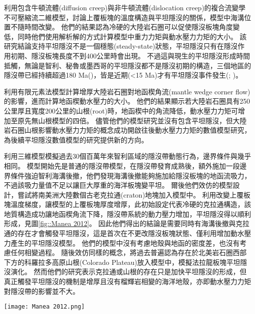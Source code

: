 \citealp{Thermal2012}利用包含牛頓流體(diffusion creep)與非牛頓流體(dislocation creep)的複合流變學不可壓縮流二維模型，討論上覆板塊的溫度構造與平坦隱沒的關係，模型中海溝位置不隨時間改變。
他們的結果認為冷硬的大陸岩石圈可以促使隱沒板塊角度變低，同時他們使用解析解的方式計算模型中重力力矩與動水壓力力矩的大小。
該研究結論支持平坦隱沒不是一個穩態(steady-state)狀態，平坦隱沒只有在隱沒作用初期、隱沒板塊長度不到400公里時會出現。
不過這與現生的平坦隱沒形成時間抵觸，無論是智利、秘魯或墨西哥的平坦隱沒都不是隱沒初期的構造，三個地區的隱沒帶已經持續超過180 Ma(\citealp{Schellart2021})，皆是近期(<15 Ma)才有平坦隱沒事件發生(\citealp{chen2019southward}; \citealp{hu2021southward})。

\citealp{o2009subduction}利用有限元素法模型計算增厚大陸岩石圈對地函楔角流(mantle wedge corner flow)的影響，進而計算地函楔動水壓力的大小。
他們的結果顯示若大陸岩石圈具有250公里厚且寬度200公里的山根(root)時，地函楔中的角流降低，動水壓力力矩可增加至原先無山根模型的四倍。
儘管他們的模型研究並沒有包含平坦隱沒，但大陸岩石圈山根影響動水壓力力矩的概念成功開啟往後動水壓力力矩的數值模型研究，為後續平坦隱沒數值模型的研究提供新的方向。

\citealp{Manea2012Chile}利用三維模型模擬過去30個百萬年來智利區域的隱沒帶動態行為，邊界條件與\citealp{Thermal2012}幾乎相同。
模型開始先是普通的隱沒帶模型，在隱沒帶發育成熟後，額外施加一段邊界條件強迫智利海溝後撤，他們發現海溝後撤能夠施加給隱沒板塊的地函流吸力，不過該吸力量值不足以讓巨大厚重的海洋板塊變平坦。
爾後他們效仿\citealp{o2009subduction}的模型設計，嘗試將南美洲大陸數個古老克拉通(craton)地塊加入模型中。
利用改變上覆板塊溫度梯度，讓模型的上覆板塊厚度增厚，此初始設定代表冷硬的克拉通構造，該地質構造成功讓地函楔角流下降，隱沒帶系統的動力壓力增加，平坦隱沒得以順利形成，見圖\ref{fig::Manea 2012}。
因此他們得出的結論是需要同時有海溝後撤與克拉通的存在才會觸發平坦隱沒，這是首次在不更改隱沒板塊狀態、僅利用增加動水壓力產生的平坦隱沒模型。
他們的模型中沒有考慮地殼與地函的密度差，也沒有考慮任何相變過程。
隨後\citealp{Liu2016}效仿同樣的概念，將過去普遍認為存在於北美岩石圈西部下方的科羅拉多高原山根(Colorado Plateau)放入模型中，模擬法拉龍板塊平坦隱沒演化。
然而他們的研究表示克拉通或山根的存在只是加快平坦隱沒的形成，但真正觸發平坦隱沒的機制是增厚且沒有榴輝岩相變的海洋地殼，亦即動水壓力力矩對隱沒帶的影響並不大。
\begin{figure*}[ht!]
    \centering
    \texttt{[image: Manea 2012.png]}
    \caption[\citealp{Manea2012Chile}中的智利平坦隱沒模型]{\citealp{Manea2012Chile}中的智利平坦隱沒模型，模型中同時加入海溝後撤邊界條件與增厚大陸岩石圈可以讓平坦隱沒發育。模型背景顏色為溫度。
    }
    \label{fig::Manea 2012}
\end{figure*}

